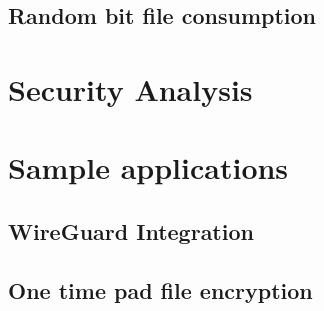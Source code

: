 \documentclass{paper}
\begin{document}
			\subsection{Random bit file consumption}
				
		
		\section{Security Analysis}
		\section{Sample applications}
			\subsection{WireGuard Integration}
			\subsection{One time pad file encryption}
		
						
\end{document}
